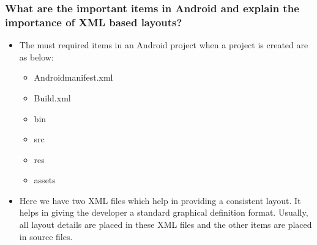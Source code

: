\documentclass[9pt, b5paper]{article}
\begin{document}
\subsubsection{What are the important items in Android and explain the importance of XML based layouts?}
\label{sec-1-1-5}
\begin{itemize}
\item The must required items in an Android project when a project is created are as below:
\begin{itemize}
\item Androidmanifest.xml
\item Build.xml
\item bin
\item src
\item res
\item assets
\end{itemize}
\item Here we have two XML files which help in providing a consistent layout. It helps in giving the developer a standard graphical definition format. Usually, all layout details are placed in these XML files and the other items are placed in source files.
\end{itemize}
\end{document}
